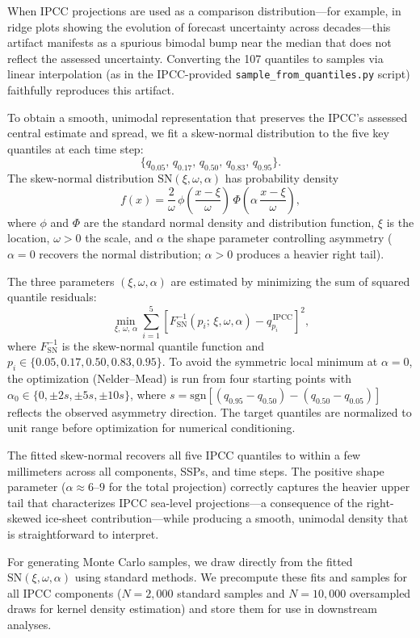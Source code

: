 \documentclass[11pt]{article}
\begin{document}
When IPCC projections are used as a comparison distribution---for example, in ridge plots showing the evolution of forecast uncertainty across decades---this artifact manifests as a spurious bimodal bump near the median that does not reflect the assessed uncertainty. Converting the 107 quantiles to samples via linear interpolation (as in the IPCC-provided \texttt{sample\_from\_quantiles.py} script) faithfully reproduces this artifact.

To obtain a smooth, unimodal representation that preserves the IPCC's assessed central estimate and spread, we fit a skew-normal distribution to the five key quantiles at each time step:
\begin{equation}
    \{q_{0.05},\, q_{0.17},\, q_{0.50},\, q_{0.83},\, q_{0.95}\}.
    \label{eq:ipcc_quantiles}
\end{equation}
The skew-normal distribution $\mathrm{SN}(\xi, \omega, \alpha)$ has probability density
\begin{equation}
    f(x) = \frac{2}{\omega}\,\phi\!\left(\frac{x - \xi}{\omega}\right)\,\Phi\!\left(\alpha\,\frac{x - \xi}{\omega}\right),
    \label{eq:skewnorm_pdf}
\end{equation}
where $\phi$ and $\Phi$ are the standard normal density and distribution function, $\xi$ is the location, $\omega > 0$ the scale, and $\alpha$ the shape parameter controlling asymmetry ($\alpha = 0$ recovers the normal distribution; $\alpha > 0$ produces a heavier right tail).

The three parameters $(\xi, \omega, \alpha)$ are estimated by minimizing the sum of squared quantile residuals:
\begin{equation}
    \min_{\xi,\,\omega,\,\alpha} \sum_{i=1}^{5} \left[ F^{-1}_{\mathrm{SN}}(p_i;\, \xi, \omega, \alpha) - q_{p_i}^{\,\mathrm{IPCC}} \right]^2,
    \label{eq:skewnorm_fit}
\end{equation}
where $F^{-1}_{\mathrm{SN}}$ is the skew-normal quantile function and $p_i \in \{0.05, 0.17, 0.50, 0.83, 0.95\}$. To avoid the symmetric local minimum at $\alpha = 0$, the optimization (Nelder--Mead) is run from four starting points with $\alpha_0 \in \{0, \pm 2s, \pm 5s, \pm 10s\}$, where $s = \mathrm{sgn}[(q_{0.95} - q_{0.50}) - (q_{0.50} - q_{0.05})]$ reflects the observed asymmetry direction. The target quantiles are normalized to unit range before optimization for numerical conditioning.

The fitted skew-normal recovers all five IPCC quantiles to within a few millimeters across all components, SSPs, and time steps. The positive shape parameter ($\alpha \approx 6$--$9$ for the total projection) correctly captures the heavier upper tail that characterizes IPCC sea-level projections---a consequence of the right-skewed ice-sheet contribution---while producing a smooth, unimodal density that is straightforward to interpret.

For generating Monte Carlo samples, we draw directly from the fitted $\mathrm{SN}(\xi, \omega, \alpha)$ using standard methods. We precompute these fits and samples for all IPCC components ($N = 2{,}000$ standard samples and $N = 10{,}000$ oversampled draws for kernel density estimation) and store them for use in downstream analyses.



\end{document}
